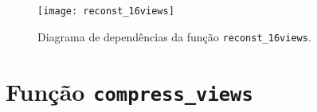 \begin{figure}[!hp]
    \centering
    \texttt{[image: reconst\_16views]}
    \caption{Diagrama de dependências da função \texttt{reconst\_16views}.}
    \label{fig:reconst_16views}
\end{figure}


\newpage
\section{Função \texttt{compress\_views}}
\label{sec::doc-codigo:compress_views}

